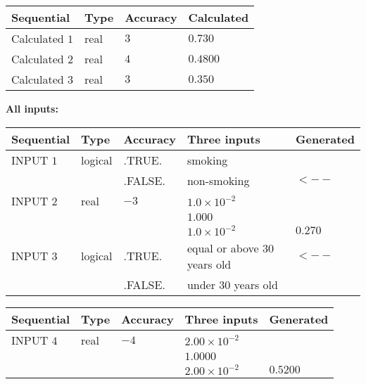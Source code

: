 \documentclass[12pt]{article}
\begin{document}
   
   
   
\noindent{}
   
   
  
  
\noindent\begin{tabular}{|l|l|l|l|}
\hline
 Sequential & Type & Accuracy & Calculated \\ 
\hline
 
 
  Calculated $            1 $ & real & $            3  $ & 
 $ 0.730 $ 
 \\  \hline  
 
 
  Calculated $            2 $ & real & $            4  $ & 
 $ 0.4800 $ 
 \\  \hline  
 
 
  Calculated $            3 $ & real & $            3  $ & 
 $ 0.350 $ 
 \\  \hline  
 \end{tabular}
   
   
   
   
\noindent\vspace{0.1in}\hspace{-0.08in} {\textbf{\Large{All inputs: }}}
   
   
  
  
\noindent\begin{tabular}{|l|l|l|l|l|}
\hline
 Sequential & Type & Accuracy & Three inputs & Generated \\ 
\hline
 
 
  INPUT $            1 $ & logical & .TRUE. & 
 smoking & 
  \\
  & & .FALSE. & 
  non-smoking & 
  $ <-- $ 
 \\  \hline  
 
 
  INPUT $            2 $ & real & $           -3  $ & $
 1.0 \times 10^{-2}
  $ & \\
  & & &  $
 1.000
  $ & \\
  & & &  $
 1.0 \times 10^{-2}
 $ & $ 0.270 $ 
 \\  \hline  
 
 
  INPUT $            3 $ & logical & .TRUE. & 
 equal or above 30 years old & 
  $ <-- $ 
  \\
  & & .FALSE. & 
  under 30 years old & 
 \\  \hline  
 \end{tabular}
   
   
  
  
\noindent\begin{tabular}{|l|l|l|l|l|}
\hline
 Sequential & Type & Accuracy & Three inputs & Generated \\ 
\hline
 
 
  INPUT $            4 $ & real & $           -4  $ & $
 2.00 \times 10^{-2}
  $ & \\
  & & &  $
 1.0000
  $ & \\
  & & &  $
 2.00 \times 10^{-2}
 $ & $ 0.5200 $ 
 \\  \hline  
 \end{tabular}
   
\end{document}
